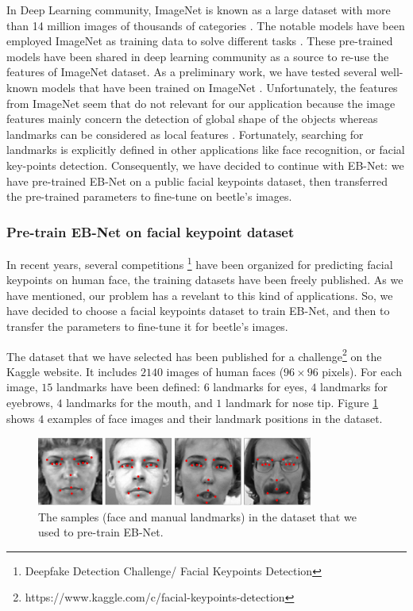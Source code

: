 \documentclass[review]{elsarticle}
\begin{document}
In Deep Learning community, ImageNet is known as a large dataset with more than 14 million images of thousands of categories \cite{deng2009imagenet}. The notable models have been employed ImageNet as training data to solve different tasks \cite{krizhevsky2012imagenet, simonyan2014very}. These pre-trained models have been shared in deep learning community as a source to re-use the features of ImageNet dataset. As a preliminary work, we have tested several well-known models \cite{krizhevsky2012imagenet, simonyan2014very} that have been trained on ImageNet \cite{deng2009imagenet}. Unfortunately, the features from ImageNet seem that do not relevant for our application because the image features mainly concern the detection of global shape of the objects whereas landmarks can be considered as local features \cite{lin2016homemade}. Fortunately, searching for landmarks is explicitly defined in other applications like face recognition, or facial key-points detection. Consequently, we have decided to continue with EB-Net: we have pre-trained EB-Net on a public facial keypoints dataset, then transferred the pre-trained parameters to fine-tune on beetle's images.

\subsubsection{Pre-train EB-Net on facial keypoint dataset}
In recent years, several competitions \footnote{Deepfake Detection Challenge/ Facial Keypoints Detection} have been organized for predicting facial keypoints on human face, the training datasets have been freely published. As we have mentioned, our problem has a revelant to this kind of applications. So, we have decided to choose a facial keypoints dataset to train EB-Net, and then to transfer the parameters to fine-tune it for beetle's images.

The dataset that we have selected has been published for a challenge\footnote{https://www.kaggle.com/c/facial-keypoints-detection} on the Kaggle website. It includes $2140$ images of human faces ($96 \times 96$ pixels). For each image, $15$ landmarks have been defined: $6$ landmarks for eyes, $4$ landmarks for eyebrows, $4$ landmarks for the mouth, and $1$ landmark for nose tip. Figure \ref{fighmface} shows $4$ examples of face images and their landmark positions in the dataset.

\begin{figure}[h!]
	\centering
	\includegraphics[width=0.81\textwidth]{images/face_dataset_2}
	\caption{The samples (face and manual landmarks) in the dataset that we used to pre-train EB-Net.}
	\label{fighmface}
\end{figure}
\end{document}
